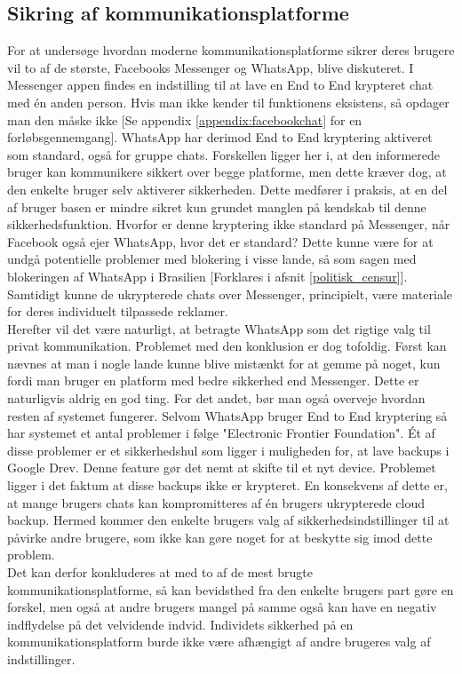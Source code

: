 \subsection{Sikring af kommunikationsplatforme}
\label{kommunikationsplatforme}
For at undersøge hvordan moderne kommunikationsplatforme sikrer deres brugere vil to af de største, Facebooks Messenger og WhatsApp, blive diskuteret. I Messenger appen findes en indstilling til at lave en End to End krypteret chat med én anden person. Hvis man ikke kender til funktionens eksistens, så opdager man den måske ikke [Se appendix \ref{appendix:facebookchat} for en forløbsgennemgang]. WhatsApp har derimod End to End kryptering aktiveret som standard, også for gruppe chats. Forskellen ligger her i, at den informerede bruger kan kommunikere sikkert over begge platforme, men dette kræver dog, at den enkelte bruger selv aktiverer sikkerheden. Dette medfører i praksis, at en del af bruger basen er mindre sikret kun grundet manglen på kendskab til denne sikkerhedsfunktion. Hvorfor er denne kryptering ikke standard på Messenger, når Facebook også ejer WhatsApp\cite{Facebook_WhatsApp_Merger}, hvor det er standard? Dette kunne være for at undgå potentielle problemer med blokering i visse lande\cite{Facebook_security_features}, så som sagen med blokeringen af WhatsApp i Brasilien [Forklares i afsnit \ref{politisk_censur}]. Samtidigt kunne de ukrypterede chats over Messenger, principielt, være materiale for deres individuelt tilpassede reklamer.
\\
Herefter vil det være naturligt, at betragte WhatsApp som det rigtige valg til privat kommunikation. Problemet med den konklusion er dog tofoldig. Først kan nævnes at man i nogle lande kunne blive mistænkt for at gemme på noget, kun fordi man bruger en platform med bedre sikkerhed end Messenger. Dette er naturligvis aldrig en god ting. For det andet, bør man også overveje hvordan resten af systemet fungerer. Selvom WhatsApp bruger End to End kryptering så har systemet et antal problemer i følge "Electronic Frontier Foundation"\cite{WhatsApp_Security_Concerns}. Ét af disse problemer er et sikkerhedshul som ligger i muligheden for, at lave backups i Google Drev. Denne feature gør det nemt at skifte til et nyt device. Problemet ligger i det faktum at disse backups ikke er krypteret. En konsekvens af dette er, at mange brugers chats kan kompromitteres af én brugers ukrypterede cloud backup. Hermed kommer den enkelte brugers valg af sikkerhedsindstillinger til at påvirke andre brugere, som ikke kan gøre noget for at beskytte sig imod dette problem.
\\
Det kan derfor konkluderes at med to af de mest brugte kommunikationsplatforme, så kan bevidsthed fra den enkelte brugers part gøre en forskel, men også at andre brugers mangel på samme også kan have en negativ indflydelse på det velvidende indvid. Individets sikkerhed på en kommunikationsplatform burde ikke være afhængigt af andre brugeres valg af indstillinger.